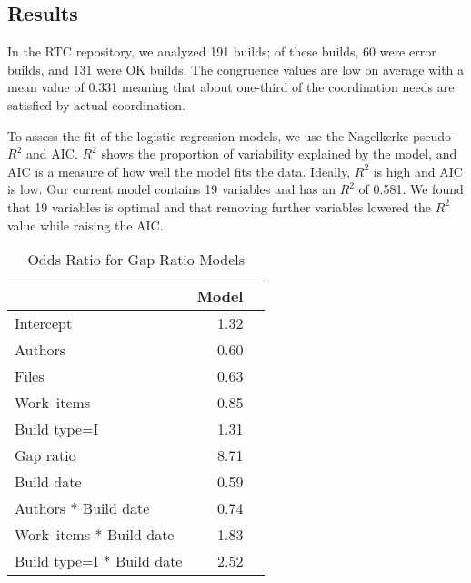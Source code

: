 \subsection{Results}
\label{sec:results}
In the RTC repository, we analyzed 191 builds; of these builds, 60 were error builds, and 131 were OK builds.
The congruence values are low on average with a mean value of 0.331 meaning that about one-third of the coordination needs are satisfied by actual coordination.

To assess the fit of the logistic regression models, we use the Nagelkerke pseudo-$R^2$ and AIC. $R^2$ shows the proportion of variability explained by the model, and AIC is a measure of how well the model fits the data. Ideally, $R^2$ is high and AIC is low. Our current model contains 19 variables and has an $R^2$ of 0.581. 
We found that 19 variables is optimal and that removing further variables lowered the $R^2$ value while raising the AIC.


\begin{table}[t]
\begin{center}
\begin{tabular}{lrr}
  \toprule
 & Model\\ 
  \midrule
Intercept & 1.32 \\ 
  Authors &  0.60 \\ 
  Files &  0.63 \\ 
  Work~items  & 0.85 \\ 
  Build type=I  & 1.31 \\ 
  Gap ratio  & 8.71 \\ 
  Build date  & 0.59 \\ 
  Authors * Build date & 0.74 \\ 
  Work~items * Build date  & 1.83 \\ 
  Build type=I * Build date  & 2.52 \\ 
   \bottomrule
\end{tabular}
\caption{Odds Ratio for Gap Ratio Models}
\label{tab:oddsratio_gapsize}
\end{center}
\end{table}

